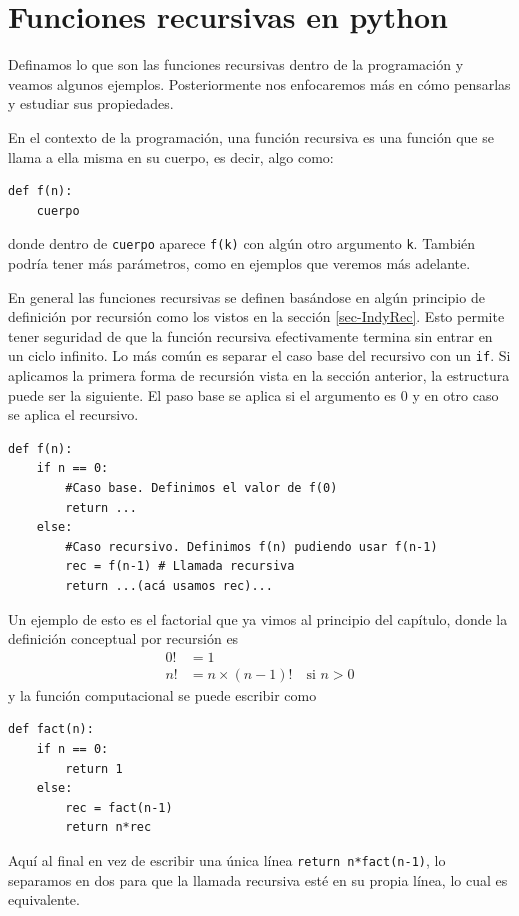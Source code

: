 \documentclass[a4paper, 12pt]{report}
\newcommand{\te}{\text}
\theoremstyle{definition}
\begin{document}
\section{Funciones recursivas en python}\label{sec-funRecPython}

Definamos lo que son las funciones recursivas dentro de la programación y veamos algunos ejemplos. Posteriormente nos enfocaremos más en cómo pensarlas y estudiar sus propiedades.

En el contexto de la programación, una función recursiva es una función que se llama a ella misma en su cuerpo, es decir, algo como:
\begin{verbatim}
def f(n):
    cuerpo
\end{verbatim}
donde dentro de {\tt cuerpo} aparece {\tt f(k)} con algún otro argumento {\tt k}. También podría tener más parámetros, como en ejemplos que veremos más adelante.

En general las funciones recursivas se definen basándose en algún principio de definición por recursión como los vistos en la sección \ref{sec-IndyRec}. Esto permite tener seguridad de que la función recursiva efectivamente termina sin entrar en un ciclo infinito. Lo más común es separar el caso  base del recursivo con un {\tt if}. Si aplicamos la primera forma de recursión vista en la sección anterior, la estructura puede ser la siguiente. El paso base se aplica si el argumento es $0$ y en otro caso se aplica el recursivo.
\begin{verbatim}
def f(n):
    if n == 0:
        #Caso base. Definimos el valor de f(0)
        return ...
    else:
        #Caso recursivo. Definimos f(n) pudiendo usar f(n-1)
        rec = f(n-1) # Llamada recursiva
        return ...(acá usamos rec)...
\end{verbatim}
Un ejemplo de esto es el factorial que ya vimos al principio del capítulo, donde la definición conceptual por recursión es
\begin{align*}
	0!&=1\\
	n!&= n\times (n-1)!\quad\te{si }n>0
\end{align*}
y la función computacional se puede escribir como
\begin{verbatim}
def fact(n):
    if n == 0:
        return 1
    else:
        rec = fact(n-1)
        return n*rec
\end{verbatim}
Aquí al final en vez de escribir una única línea {\tt return n*fact(n-1)}, lo separamos en dos para que la llamada recursiva esté en su propia línea, lo cual es equivalente.
\end{document}
